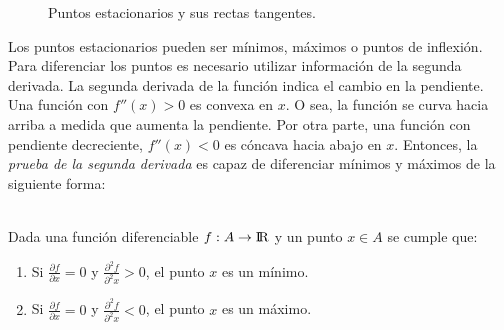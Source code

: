 \begin{figure}[h]
\centering
\caption{Puntos estacionarios y sus rectas tangentes.}
\label{fig:Puntos estacionarios y sus rectas tangentes}
\end{figure}

Los puntos estacionarios pueden ser mínimos, máximos o puntos de inflexión. Para diferenciar los puntos es necesario utilizar información de la segunda derivada.  La segunda derivada de la función indica el cambio en la pendiente. Una función con $f''(x)> 0$ es convexa en $x$. O sea, la función se curva hacia arriba a medida que aumenta la pendiente. Por otra parte, una función con pendiente decreciente, $f'' (x) <0$ es cóncava hacia abajo en $x$. Entonces, la \textit{prueba de la segunda derivada} es capaz de diferenciar mínimos y máximos de la siguiente forma:
\\
\\
\begin{defn}
Dada una función diferenciable $f:A \to {\rm I\!R}$  y un punto $x \in A$ se cumple que:
\begin{enumerate}
\item Si $ \frac{\partial f}{\partial x} =0$ y $\frac{\partial^2 f}{\partial^2 x} >0$, el punto $x$ es un mínimo.
\item Si $ \frac{\partial f}{\partial x} =0$ y  $\frac{\partial^2 f}{\partial^2 x} <0$, el punto $x$ es un máximo.
\end{enumerate}
\end{defn}

